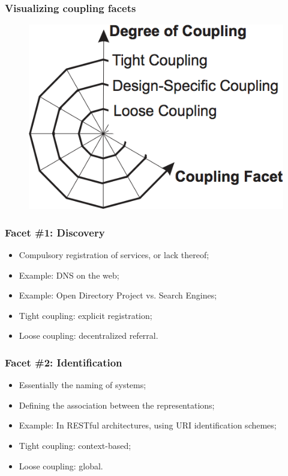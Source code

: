 \documentclass{beamer}
\begin{document}
\begin{frame}
    \frametitle{Visualizing coupling facets}
    \begin{figure}
        \centering
        \includegraphics[height=0.6\paperheight]{fig3-0.png}
    \end{figure}
\end{frame}

\begin{frame}
    \frametitle{Facet \#1: Discovery}
    \begin{itemize}
        \item Compulsory registration of services, or lack thereof;
        \item Example: DNS on the web;
        \item Example: Open Directory Project vs. Search Engines;
        \item Tight coupling: explicit registration;
        \item Loose coupling: decentralized referral.
    \end{itemize}
\end{frame}

\begin{frame}
    \frametitle{Facet \#2: Identification}
    \begin{itemize}
        \item Essentially the naming of systems;
        \item Defining the association between the representations;
        \item Example: In RESTful architectures, using URI identification schemes;
        \item Tight coupling: context-based;
        \item Loose coupling: global.
    \end{itemize}
\end{frame}
\end{document}
